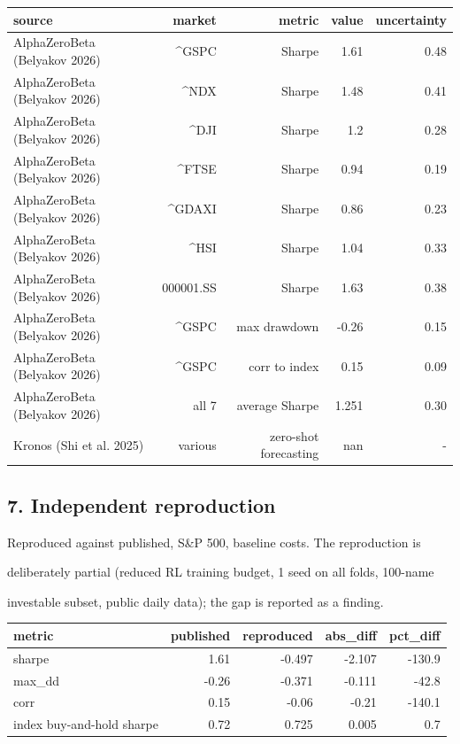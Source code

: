 \begin{center}\footnotesize\begin{longtable}{lrrrr}
\toprule
source & market & metric & value & uncertainty \\
\midrule
AlphaZeroBeta (Belyakov 2026) & \textasciicircum{}GSPC & Sharpe & 1.61 & 0.48 \\
AlphaZeroBeta (Belyakov 2026) & \textasciicircum{}NDX & Sharpe & 1.48 & 0.41 \\
AlphaZeroBeta (Belyakov 2026) & \textasciicircum{}DJI & Sharpe & 1.2 & 0.28 \\
AlphaZeroBeta (Belyakov 2026) & \textasciicircum{}FTSE & Sharpe & 0.94 & 0.19 \\
AlphaZeroBeta (Belyakov 2026) & \textasciicircum{}GDAXI & Sharpe & 0.86 & 0.23 \\
AlphaZeroBeta (Belyakov 2026) & \textasciicircum{}HSI & Sharpe & 1.04 & 0.33 \\
AlphaZeroBeta (Belyakov 2026) & 000001.SS & Sharpe & 1.63 & 0.38 \\
AlphaZeroBeta (Belyakov 2026) & \textasciicircum{}GSPC & max drawdown & -0.26 & 0.15 \\
AlphaZeroBeta (Belyakov 2026) & \textasciicircum{}GSPC & corr to index & 0.15 & 0.09 \\
AlphaZeroBeta (Belyakov 2026) & all 7 & average Sharpe & 1.251 & 0.30 \\
Kronos (Shi et al. 2025) & various & zero-shot forecasting & nan & - \\
\bottomrule
\end{longtable}\end{center}

\subsection*{7. Independent reproduction}

Reproduced against published, S\&P 500, baseline costs. The reproduction is\par
deliberately partial (reduced RL training budget, 1 seed on all folds, 100-name\par
investable subset, public daily data); the gap is reported as a finding.\par

\begin{center}\footnotesize\begin{longtable}{lrrrr}
\toprule
metric & published & reproduced & abs\_diff & pct\_diff \\
\midrule
sharpe & 1.61 & -0.497 & -2.107 & -130.9 \\
max\_dd & -0.26 & -0.371 & -0.111 & -42.8 \\
corr & 0.15 & -0.06 & -0.21 & -140.1 \\
index buy-and-hold sharpe & 0.72 & 0.725 & 0.005 & 0.7 \\
\bottomrule
\end{longtable}\end{center}

